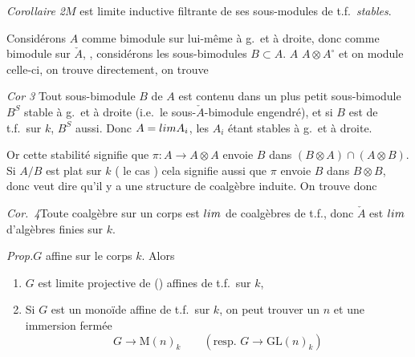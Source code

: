 \documentclass[11pt,a4paper]{article}
\begin{document}
\emph{Corollaire 2}\quad $M$ est limite inductive filtrante de ses sous-modules de t.f.\ \emph{stables}.

 \struck{\ill{}} Considérons $A$ comme bimodule sur lui-même \add{\uncertain{\ill{}}} à g.\ et à droite,  donc comme bimodule sur $\check{A}$,  , considérons les sous-bimodules $B \subset A$.   \struck{\ill{} \ill{} \ill{}}  $A$    \ill{} $A \otimes A^{\circ}$ et on module \ill{} celle-ci, on trouve directement, on trouve

\emph{Cor 3}\quad \struck{\ill{}} Tout sous-bimodule $B$ de $A$ est contenu dans un plus petit sous-bimodule $B^{S}$  stable à g.\ et à droite (i.e.\ le sous-$\check{A}$-bimodule engendré), et si $B$ est de t.f.\ sur $k$, $B^{S}$ aussi. Donc $A = \varinjlim A_i$, les $A_i$ étant stables à g.\ et à droite.

Or cette stabilité  signifie que $\pi : A \to A \otimes A$ envoie $B$ dans $(B \otimes A) \cap (A \otimes B)$. Si  $A/B$ est plat sur $k$ ( le cas ) cela signifie aussi que $\pi$ envoie $B$ dans $B \otimes B$, donc veut dire qu'il y a une structure de coalgèbre induite. On trouve donc

\emph{Cor.\ 4}\quad Toute coalgèbre  sur un corps est $\varinjlim$  de coalgèbres de t.f., donc $\check{A}$ est $\varprojlim$  d'algèbres finies sur $k$.

\emph{Prop.}\quad $G$ \struck{\ill{}}  affine sur le corps $k$. Alors
\begin{enumerate}
  \item[a)] $G$ \struck{\ill{}} est limite projective  de  \struck{\ill{}} () affines de t.f.\ sur $k$, 
  \item[b)] Si $G$ est un monoïde  affine de t.f.\ sur $k$, on peut trouver un  $n$ et une immersion fermée
  \[
    G \longrightarrow \mathrm{M}(n)_k \qquad (\text{resp.\ } G \to \mathrm{GL}(n)_k)
  \]
\end{enumerate}
\end{document}
